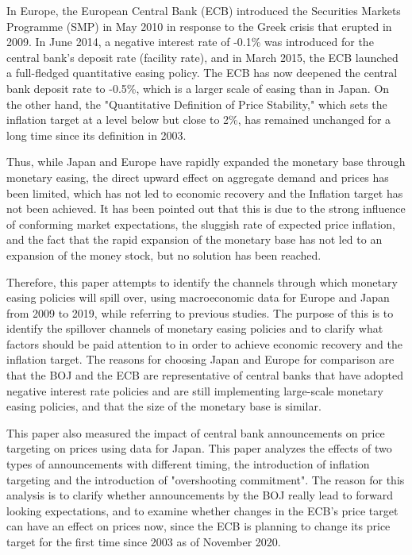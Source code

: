 \documentclass[12pt]{article}
\begin{document}
In Europe, the European Central Bank (ECB) introduced the Securities Markets Programme (SMP) in May 2010 in response to the Greek crisis that erupted in 2009.
In June 2014, a negative interest rate of -0.1\% was introduced for the central bank's deposit rate (facility rate), and in March 2015, the ECB launched a full-fledged quantitative easing policy.
The ECB has now deepened the central bank deposit rate to -0.5\%, which is a larger scale of easing than in Japan.
On the other hand, the "Quantitative Definition of Price Stability," which sets the inflation target at a level below but close to 2\%, has remained unchanged for a long time since its definition in 2003.

Thus, while Japan and Europe have rapidly expanded the monetary base through monetary easing, the direct upward effect on aggregate demand and prices has been limited, which has not led to economic recovery and the Inflation target has not been achieved.
It has been pointed out that this is due to the strong influence of conforming market expectations, the sluggish rate of expected price inflation, and the fact that the rapid expansion of the monetary base has not led to an expansion of the money stock, but no solution has been reached.

Therefore, this paper attempts to identify the channels through which monetary easing policies will spill over, using macroeconomic data for Europe and Japan from 2009 to 2019, while referring to previous studies.
The purpose of this is to identify the spillover channels of monetary easing policies and to clarify what factors should be paid attention to in order to achieve economic recovery and the inflation target.
The reasons for choosing Japan and Europe for comparison are that the BOJ and the ECB are representative of central banks that have adopted negative interest rate policies and are still implementing large-scale monetary easing policies, and that the size of the monetary base is similar.

This paper also measured the impact of central bank announcements on price targeting on prices using data for Japan. This paper analyzes the effects of two types of announcements with different timing, the introduction of inflation targeting and the introduction of "overshooting commitment".
The reason for this analysis is to clarify whether announcements by the BOJ really lead to forward looking expectations, and to examine whether changes in the ECB's price target can have an effect on prices now, since the ECB is planning to change its price target for the first time since 2003 as of November 2020.
\end{document}
